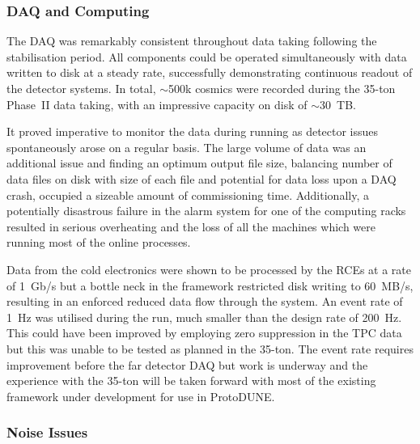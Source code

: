 \subsubsection{DAQ and Computing}\label{sec:35tonPhaseIIOutcomesDAQ}

The DAQ was remarkably consistent throughout data taking following the stabilisation period.  All components could be operated simultaneously with data written to disk at a steady rate, successfully demonstrating continuous readout of the detector systems.  In total, $\sim$500k cosmics were recorded during the 35-ton Phase~II data taking, with an impressive capacity on disk of $\sim$30~TB.

It proved imperative to monitor the data during running as detector issues spontaneously arose on a regular basis.  The large volume of data was an additional issue and finding an optimum output file size, balancing number of data files on disk with size of each file and potential for data loss upon a DAQ crash, occupied a sizeable amount of commissioning time.  Additionally, a potentially disastrous failure in the alarm system for one of the computing racks resulted in serious overheating and the loss of all the machines which were running most of the online processes.

Data from the cold electronics were shown to be processed by the RCEs at a rate of 1~Gb/s but a bottle neck in the framework restricted disk writing to 60~MB/s, resulting in an enforced reduced data flow through the system.  An event rate of 1~Hz was utilised during the run, much smaller than the design rate of 200~Hz.  This could have been improved by employing zero suppression in the TPC data but this was unable to be tested as planned in the 35-ton.  The event rate requires improvement before the far detector DAQ but work is underway and the experience with the 35-ton will be taken forward with most of the existing framework under development for use in ProtoDUNE.

\subsubsection{Noise Issues}\label{sec:35tonPhaseIIOutcomesNoise}

